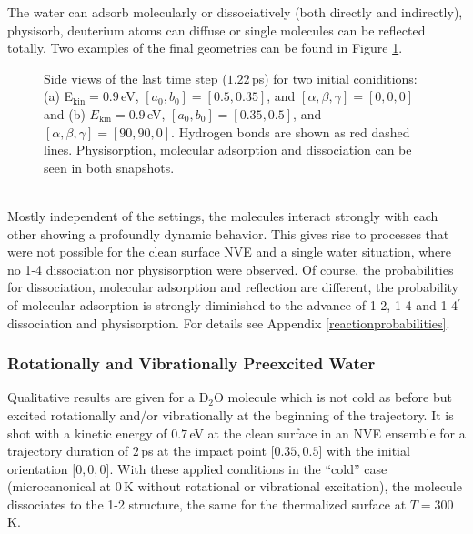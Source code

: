 \documentclass[11pt,DIV=13,BCOR=5mm,a4paper,headinclude]{scrbook}
\begin{document}
The water can adsorb molecularly or dissociatively (both directly and indirectly), physisorb, deuterium atoms can diffuse or single molecules can be reflected totally.
Two examples of the final geometries can be found in Figure \ref{abb:tetramer_traj}.
\begin{figure}[!ht]
\centering
{} 
\quad
{}
\caption{Side views of the last time step ($1.22\,$ps) for two initial coniditions: (a) E$_\textrm{kin}=0.9\,$eV, $[a_0,b_0]=[0.5,0.35]$, and $[\alpha,\beta,\gamma]=[0,0,0]$ and (b)  $E_\textrm{kin}=0.9\,$eV, $[a_0,b_0]=[0.35,0.5]$, 
 and $[\alpha,\beta,\gamma]=[90,90,0]$.
Hydrogen bonds are shown as red dashed lines.
Physisorption, molecular adsorption and dissociation can be seen in both snapshots.}
\label{abb:tetramer_traj}
\end{figure}
\\

Mostly independent of the settings, the molecules interact strongly with each other showing a profoundly dynamic behavior.
This gives rise to processes that were not possible for the clean surface NVE and a single water situation, where no 1-4 dissociation nor physisorption were observed.
Of course, the probabilities for dissociation, molecular adsorption and reflection are different, the probability of molecular adsorption is strongly diminished to the advance of 1-2, 1-4 and 1-4$^\prime$ dissociation and physisorption.
For details see Appendix \ref{reactionprobabilities}.

\subsubsection{Rotationally and Vibrationally Preexcited Water}\label{preex}
Qualitative results are given for a D$_2$O molecule which is not cold as before but excited rotationally and/or vibrationally at the beginning of the trajectory.
It is shot with a kinetic energy of $0.7\,$eV at the clean surface in an NVE ensemble for a trajectory duration of $2\,$ps at the impact point [$0.35,0.5$] with the initial orientation [$0,0,0$].
With these applied conditions in the ``cold'' case (microcanonical at $0\,$K without rotational or vibrational excitation), the molecule dissociates to the 1-2 structure, the same for the thermalized surface at $T=300\,$K.
\end{document}
